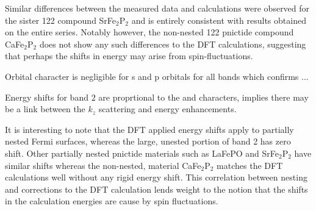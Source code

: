 Similar differences between the measured data and calculations were observed for the sister 122 compound SrFe$_2$P$_2$\cite{Analytis2009} and is entirely consistent with results obtained on the entire \BaFePAs series\cite{Shishido2010}. Notably however, the non-nested 122 pnictide compound CaFe$_2$P$_2$ does not show any such differences to the DFT calculations, suggesting that perhaps the shifts in energy may arise from spin-fluctuations.

Orbital character is negligible for s and p orbitals for all bands which confirms ...

Energy shifts for band $2$ are proprtional to the \DzTwo and \DxzDyz characters, implies there may be a link between the $k_z$ scattering and energy enhancements.


It is interesting to note that the DFT applied energy shifts apply to partially nested Fermi surfaces, whereas the large, unested portion of band 2 has zero shift. Other partially nested pnictide materials such as LaFePO\cite{Carrington2009} and SrFe$_{2}$P$_{2}$\cite{Analytis2009} have similar shifts whereas the non-nested, material CaFe$_{2}$P$_{2}$\cite{Coldea2009} matches the DFT calculations well without any rigid energy shift. This correlation between nesting and corrections to the DFT calculation lends weight to the notion that the shifts in the calculation energies are cause by spin fluctuations.


